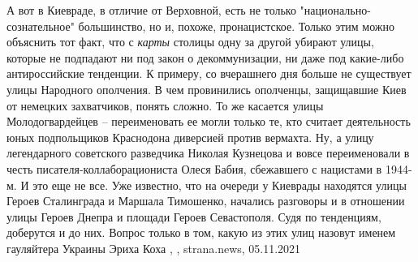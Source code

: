 А вот в Киевраде, в отличие от Верховной, есть не только
"национально-сознательное" большинство, но и, похоже, пронацистское. Только
этим можно объяснить тот факт, что с \emph{карты} столицы одну за другой
убирают улицы, которые не подпадают ни под закон о декоммунизации, ни даже под
какие-либо антироссийские тенденции.  К примеру, со вчерашнего дня больше не
существует улицы Народного ополчения. В чем провинились ополченцы, защищавшие
Киев от немецких захватчиков, понять сложно.  То же касается улицы
Молодогвардейцев – переименовать ее могли только те, кто считает деятельность
юных подпольщиков Краснодона диверсией против вермахта.  Ну, а улицу
легендарного советского разведчика Николая Кузнецова и вовсе переименовали в
честь писателя-коллаборациониста Олеся Бабия, сбежавшего с нацистами в 1944-м.
И это еще не все. Уже известно, что на очереди у Киеврады находятся улицы
Героев Сталинграда и Маршала Тимошенко, начались разговоры и в отношении улицы
Героев Днепра и площади Героев Севастополя. Судя по тенденциям, доберутся и до
них. Вопрос только в том, какую из этих улиц назовут именем гауляйтера Украины
Эриха Коха
, 
, strana.news, 05.11.2021
